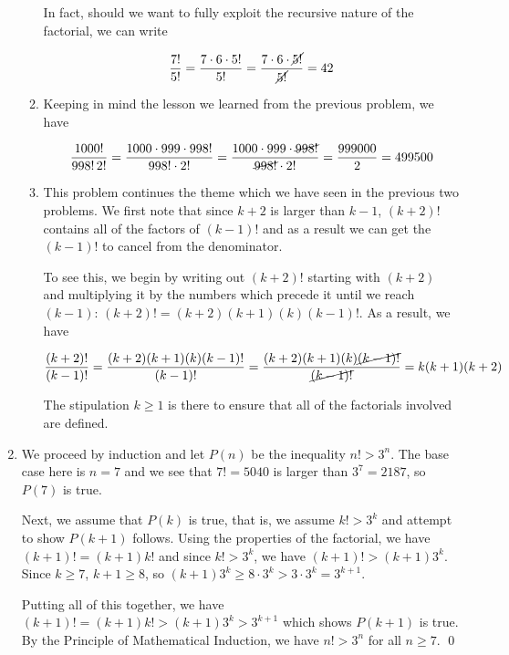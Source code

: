 \begin{ex}
\begin{enumerate}
\begin{enumerate}
In fact, should we want to fully exploit the recursive nature of the factorial, we can write

\[ \dfrac{7!}{5!} = \dfrac{7 \cdot 6 \cdot 5!}{5!} = \dfrac{7 \cdot 6 \cdot \cancel{5!}}{\cancel{5!}} = 42\]


\item  Keeping in mind the lesson we learned from the previous problem, we have

\[ \dfrac{1000!}{998! \, 2!} = \dfrac{1000 \cdot 999 \cdot 998!}{998! \cdot 2!} = \dfrac{1000 \cdot 999 \cdot \cancel{998!}}{\cancel{998!} \cdot 2!} = \dfrac{999000}{2} = 499500\]

\item  This problem continues the theme which we have seen in the previous two problems.  We first note that since $k+2$ is larger than $k-1$, $(k+2)!$ contains all of the factors of $(k-1)!$ and as a result we can get the $(k-1)!$ to cancel from the denominator.  

\smallskip

To see this,  we begin by writing out $(k+2)!$ starting with $(k+2)$ and multiplying it by the numbers which precede it until we reach $(k-1)$: $(k+2)! = (k+2)(k+1)(k)(k-1)!$.  As a result, we have

\[ \dfrac{(k+2)!}{(k-1)!} = \dfrac{(k+2)(k+1)(k)(k-1)!}{(k-1)!} = \dfrac{(k+2)(k+1)(k) \cancel{(k-1)!}}{\cancel{(k-1)!}} = k(k+1)(k+2)\]


The stipulation $k \geq 1$ is there to ensure that all of the factorials involved are defined.


\end{enumerate}

\item  We proceed by induction and let $P(n)$ be the inequality $n! > 3^n$.  The base case here is $n=7$ and we see that $7! = 5040$ is larger than $3^7 = 2187$, so $P(7)$ is true.  

\smallskip

Next, we assume that $P(k)$ is true, that is, we assume $k! > 3^k$ and attempt to show $P(k+1)$ follows. Using the properties of the factorial, we have $(k+1)! = (k+1) k!$ and since $k! > 3^k$, we have $(k+1)! > (k+1) 3^{k}$.  Since $k \geq 7$, $k+1 \geq 8$, so $(k+1) 3^{k} \geq 8 \cdot 3^{k} > 3 \cdot 3^{k} = 3^{k+1}$.  

\smallskip

Putting all of this together, we have $(k+1)! = (k+1) k! > (k+1)3^{k} > 3^{k+1}$ which shows $P(k+1)$ is true.  By the Principle of Mathematical Induction, we have $n! > 3^{n}$ for all $n \geq 7$. \qed

\end{enumerate}

\end{ex} 

